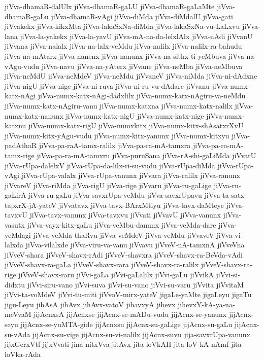 {jiVva-dhamaR-dalUlx
jiVva-dhamaR-gaLU
jiVva-dhamaR-gaLaMte
jiVva-dhamaR-gaLu
jiVva-dhamaR-vAgi
jiVva-diMda
jiVva-diMdalU
jiVva-gati
jiVvakekx
jiVva-kikxMta
jiVva-lakaSxNa-diMda
jiVva-lakaSxNa-vu-LaLxvu
jiVva-lana
jiVva-la-yakekx
jiVva-la-yavU
jiVva-mA-na-da-lelxlAlx
jiVva-nAdi
jiVvanU
jiVvana
jiVva-nalalx
jiVva-na-lalx-veMdu
jiVva-nalilx
jiVva-nalilx-ra-bahudu
jiVva-na-mAtarx
jiVva-nanenx
jiVva-nanunx
jiVva-na-sithx-ti-yeMbuva
jiVva-na-vAgu-vudu
jiVva-navu
jiVva-na-yAterx
jiVvane
jiVva-neMba
jiVva-neMbuva
jiVva-neMdU
jiVva-neMdeV
jiVva-neMdu
jiVvaneV
jiVva-niMda
jiVva-ni-dAdxne
jiVva-nigU
jiVva-nige
jiVva-ni-ruva
jiVva-ni-ru-vu-dAdare
jiVvanu
jiVva-numx-katx-nAgi
jiVva-numx-katx-nAgi-dadxlilx
jiVva-numx-katx-nAgiru-va-neMdu
jiVva-numx-katx-nAgiru-vanu
jiVva-numx-katxna
jiVva-numx-katx-nalilx
jiVva-numx-katx-nanunx
jiVva-numx-katx-nigU
jiVva-numx-katx-nige
jiVva-numx-katxnu
jiVva-numx-katx-rigU
jiVva-numxkitx
jiVva-numx-kitx-shAsatxrXvU
jiVva-numx-kitx-yAgu-vudu
jiVva-numx-kitx-yanunx
jiVva-numx-kitxyu
jiVva-padAthaR
jiVva-pa-raA-tamx-ralilx
jiVva-pa-ra-mA-tamxra
jiVva-pa-ra-mA-tamx-rige
jiVva-pa-ra-mA-tamxru
jiVva-puruSana
jiVva-rA-shi-gaLiMda
jiVvarU
jiVva-rUpa-dalelxV
jiVva-rUpa-da-lilx-ri-su-vudu
jiVva-rUpa-diMda
jiVva-rUpa-vAgi
jiVva-rUpa-valalx
jiVva-rUpa-vanunx
jiVvara
jiVva-ralilx
jiVva-ranunx
jiVvareV
jiVva-riMda
jiVva-rigU
jiVva-rige
jiVvaru
jiVva-ru-gaLige
jiVva-ru-gaLirA
jiVva-ru-gaLu
jiVva-savxrUpa-veMdu
jiVva-savxrUpavu
jiVva-ta-satx-tapxrX-jA-yateV
jiVvatavx
jiVva-tavx-BArxMtiyu
jiVva-tavx-daMteye
jiVva-tavxvU
jiVva-tavx-vanunx
jiVva-tavxvu
jiVvati
jiVvavU
jiVva-vanunx
jiVva-vasutx
jiVva-vayx-kitx-gaLu
jiVva-veMbu-danunx
jiVva-veMda-dare
jiVva-veMdagi
jiVva-veMda-thaRvu
jiVva-veMdeV
jiVva-veMdu
jiVvaveV
jiVva-vi-lalxda
jiVva-vilalxde
jiVva-viru-va-vanu
jiVvavu
jiVveV-nA-tamxnA
jiVveVna
jiVveV-shara
jiVveV-shavx-rAdi
jiVveV-shavxra
jiVveV-shavx-ra-BeVda-vAdi
jiVveV-shavx-ra-gaLa
jiVveV-shavx-rara
jiVveV-shavx-ra-ralilx
jiVveV-shavx-ra-rige
jiVveV-shavx-raru
jiVvi-gaLa
jiVvi-gaLalilx
jiVvi-gaLu
jiVvikA
jiVvi-si-didxtu
jiVvi-siru-vano
jiVvi-suva
jiVvi-su-vano
jiVvi-su-varu
jiVvita
jiVvitaM
jiVvi-ta-voMdeV
jiVvi-tu-miti
jiVvoV-mirx-yateV
jigaLe-yaMte
jigaLeyu
jigaTu
jigu-Leyu
jihAsA
jihAvx
jihAvx-vatoV
jihavxyA
jihevx
jihevxY-kA-ya-na-meVvaM
jijAcnxsA
jijAcnxse
jijAcnx-se-mADu-vudu
jijAcnx-se-yanunx
jijAcnx-seyu
jijAcnx-se-yuMTA-gide
jijAcnxsu
jijAcnx-su-gaLige
jijAcnx-su-gaLu
jijAcnx-su-vAda
jijAcnx-su-vige
jijAcnx-su-vi-nalilx
jijAcnx-suvu
jija-savxrUpa-vanunx
jijxGerxVtf
jijxVvati
jina-nitxVva
jitAvx
jita-loVkAH
jita-loV-kA-nAmf
jita-loVka-rAda
}
